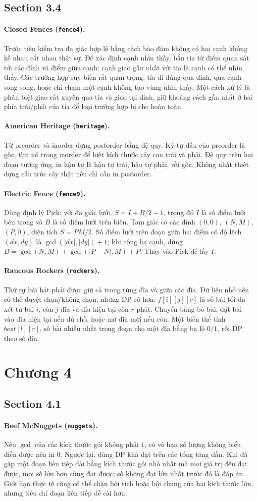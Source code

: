 \documentclass[11pt]{article}
\newcommand{\problem}[2]{\paragraph{#1 (\texttt{#2}).}}
\begin{document}
\subsection*{Section 3.4}

\problem{Closed Fences}{fence4}
Trước tiên kiểm tra đa giác hợp lệ bằng cách bảo đảm không có hai cạnh không kề nhau cắt nhau thật sự. Để xác định cạnh nhìn thấy, bắn tia từ điểm quan sát tới các đỉnh và điểm giữa cạnh; cạnh giao gần nhất với tia là cạnh có thể nhìn thấy. Các trường hợp suy biến rất quan trọng: tia đi đúng qua đỉnh, qua cạnh song song, hoặc chỉ chạm một cạnh không tạo vùng nhìn thấy. Một cách xử lý là phân biệt giao cắt xuyên qua tia và giao tại đỉnh, giữ khoảng cách gần nhất ở hai phía trái/phải của tia để loại trường hợp bị che hoàn toàn.

\problem{American Heritage}{heritage}
Từ preorder và inorder dựng postorder bằng đệ quy. Ký tự đầu của preorder là gốc; tìm nó trong inorder để biết kích thước cây con trái và phải. Đệ quy trên hai đoạn tương ứng, in hậu tự là hậu tự trái, hậu tự phải, rồi gốc. Không nhất thiết dựng cấu trúc cây thật nếu chỉ cần in postorder.

\problem{Electric Fence}{fence9}
Dùng định lý Pick: với đa giác lưới, \(S=I+B/2-1\), trong đó \(I\) là số điểm lưới bên trong và \(B\) là số điểm lưới trên biên. Tam giác có các đỉnh \((0,0)\), \((N,M)\), \((P,0)\), diện tích \(S=PM/2\). Số điểm lưới trên đoạn giữa hai điểm có độ lệch \((dx,dy)\) là \(\gcd(|dx|,|dy|)+1\); khi cộng ba cạnh, dùng \(B=\gcd(N,M)+\gcd(|P-N|,M)+P\). Thay vào Pick để lấy \(I\).

\problem{Raucous Rockers}{rockers}
Thứ tự bài hát phải được giữ cả trong từng đĩa và giữa các đĩa. Dữ liệu nhỏ nên có thể duyệt chọn/không chọn, nhưng DP rõ hơn: \(f[i][j][r]\) là số bài tối đa xét từ bài \(i\), còn \(j\) đĩa và đĩa hiện tại còn \(r\) phút. Chuyển bằng bỏ bài, đặt bài vào đĩa hiện tại nếu đủ chỗ, hoặc mở đĩa mới nếu còn. Một biến thể tính \(best[l][r]\), số bài nhiều nhất trong đoạn cho một đĩa bằng ba lô \(0/1\), rồi DP theo số đĩa.

\section*{Chương 4}

\subsection*{Section 4.1}

\problem{Beef McNuggets}{nuggets}
Nếu \(\gcd\) của các kích thước gói không phải \(1\), có vô hạn số lượng không biểu diễn được nên in \(0\). Ngược lại, dùng DP khả đạt trên các tổng tăng dần. Khi đã gặp một đoạn liên tiếp dài bằng kích thước gói nhỏ nhất mà mọi giá trị đều đạt được, mọi số lớn hơn cũng đạt được; số không đạt lớn nhất trước đó là đáp án. Giới hạn thực tế cũng có thể chặn bởi tích hoặc bội chung của hai kích thước lớn, nhưng tiêu chí đoạn liên tiếp dễ cài hơn.
\end{document}
